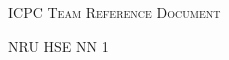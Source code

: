 \documentclass[a4paper]{article}
\begin{document}
	\thispagestyle{fancy}
	
	\begin{center}
		\Huge\textsc{ICPC Team Reference Document}
		
		\huge NRU HSE NN 1
		
		\vspace{0.50cm}
	\end{center}
	
	\begin{multicols*}{2}
		\tableofcontents
		
		\setcounter{page}{1}
	\end{multicols*}
	\enlargethispage*{\baselineskip}
	\pagebreak
	
	
	\setcounter{page}{2}
\end{document}
